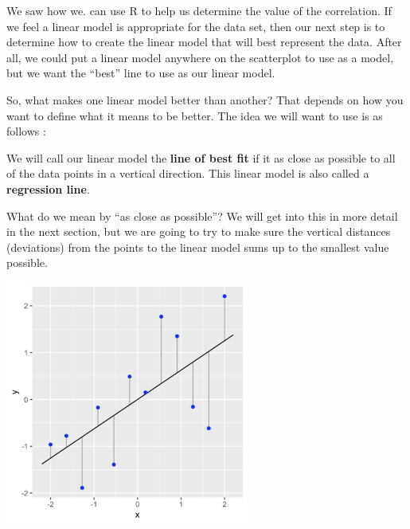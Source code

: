 \documentclass[
  letterpaper,
  DIV=11,
  numbers=noendperiod]{scrreprt}
\begin{document}
We saw how we. can use R to help us determine the value of the
correlation. If we feel a linear model is appropriate for the data set,
then our next step is to determine how to create the linear model that
will best represent the data. After all, we could put a linear model
anywhere on the scatterplot to use as a model, but we want the ``best''
line to use as our linear model.

So, what makes one linear model better than another? That depends on how
you want to define what it means to be better. The idea we will want to
use is as follows :

\begin{tcolorbox}[enhanced jigsaw, colback=white, colbacktitle=quarto-callout-tip-color!10!white, toptitle=1mm, leftrule=.75mm, arc=.35mm, titlerule=0mm, toprule=.15mm, colframe=quarto-callout-tip-color-frame, left=2mm, coltitle=black, bottomtitle=1mm, title=\textcolor{quarto-callout-tip-color}{\faLightbulb}\hspace{0.5em}{Line Of Best Fit}, rightrule=.15mm, bottomrule=.15mm, breakable, opacitybacktitle=0.6, opacityback=0]

We will call our linear model the \textbf{line of best fit} if it as
close as possible to all of the data points in a vertical direction.
This linear model is also called a \textbf{regression line}.

\end{tcolorbox}

What do we mean by ``as close as possible''? We will get into this in
more detail in the next section, but we are going to try to make sure
the vertical distances (deviations) from the points to the linear model
sums up to the smallest value possible.

\includegraphics[width=0.6\textwidth,height=\textheight]{./images/LMR_2.jpg}
\end{document}
